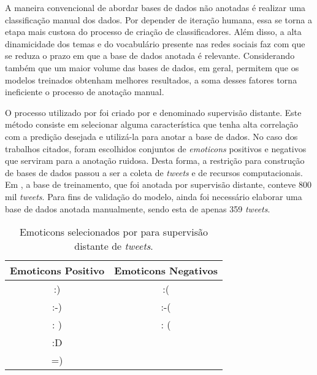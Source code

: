 A maneira convencional de abordar bases de dados não anotadas é realizar uma
classificação manual dos dados.
Por depender de iteração humana, essa se torna a etapa mais custosa do processo
de criação de classificadores.
Além disso, a alta dinamicidade dos temas e do vocabulário presente nas redes
sociais faz com que se reduza o prazo em que a base de dados anotada é
relevante.
Considerando também que um maior volume das bases de dados, em geral, permitem
que os modelos treinados obtenham melhores resultados, a soma desses fatores torna
ineficiente o processo de anotação manual.

O processo utilizado por \citet{go09} foi criado por \citet{read05} e denominado
supervisão distante.
Este método consiste em selecionar alguma característica que tenha alta correlação
com a predição desejada e utilizá-la para anotar a base de dados.
No caso dos trabalhos citados, foram escolhidos conjuntos de \textit{emoticons}
positivos e negativos que serviram para a anotação ruidosa.
Desta forma, a restrição para construção de bases de dados passou a ser a coleta
de \textit{tweets} e de recursos computacionais.
Em \citet{go09}, a base de treinamento, que foi anotada por supervisão distante,
conteve 800 mil \textit{tweets}.
Para fins de validação do modelo, ainda foi necessário elaborar uma base de
dados anotada manualmente, sendo esta de apenas 359 \textit{tweets}.

\begin{table}[h]
    \begin{center}
        \begin{tabular}{| c c |}
        \hline
        \textbf{Emoticons Positivo} & \textbf{Emoticons Negativos} \\ \hline
        :)&:( \\
        :-)&:-(\\
        : )&: (\\
        :D& \\
        =)& \\ \hline
        \end{tabular}
        \caption{Emoticons selecionados por \citet{go09} para supervisão
        distante de \textit{tweets}.}
        \label{tab:supervision_emoticons}
    \end{center}
\end{table}

